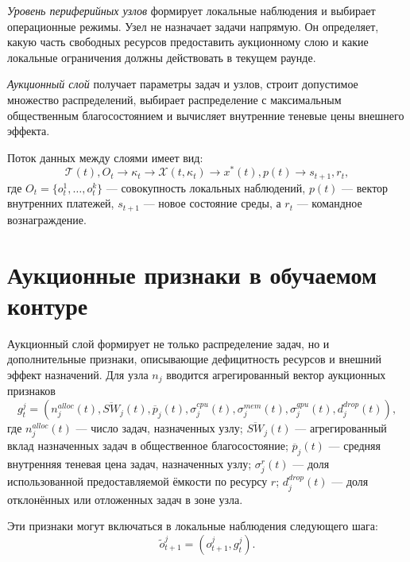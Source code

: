 \textit{Уровень периферийных узлов} формирует локальные наблюдения и выбирает операционные режимы. Узел не назначает задачи напрямую. Он определяет, какую часть свободных ресурсов предоставить аукционному слою и какие локальные ограничения должны действовать в текущем раунде.

\textit{Аукционный слой} получает параметры задач и узлов, строит допустимое множество распределений, выбирает распределение с максимальным общественным благосостоянием и вычисляет внутренние теневые цены внешнего эффекта.

Поток данных между слоями имеет вид:
\begin{equation}
    \mathcal{T}(t), O_t \rightarrow \kappa_t \rightarrow \mathcal{X}(t,\kappa_t) \rightarrow x^*(t),p(t) \rightarrow s_{t+1}, r_t,
    \label{eq:ch5_data_flow}
\end{equation}
где $O_t=\{o^1_t,\ldots,o^k_t\}$ --- совокупность локальных наблюдений, $p(t)$ --- вектор внутренних платежей, $s_{t+1}$ --- новое состояние среды, а $r_t$ --- командное вознаграждение.

\section{Аукционные признаки в обучаемом контуре}

Аукционный слой формирует не только распределение задач, но и дополнительные признаки, описывающие дефицитность ресурсов и внешний эффект назначений. Для узла $n_j$ вводится агрегированный вектор аукционных признаков
\begin{equation}
    g^j_t = \left(
    n^{alloc}_j(t),
    \overline{SW}_j(t),
    \overline{p}_j(t),
    \sigma^{cpu}_j(t),
    \sigma^{mem}_j(t),
    \sigma^{gpu}_j(t),
    d^{drop}_j(t)
    \right),
    \label{eq:ch5_auction_features}
\end{equation}
где $n^{alloc}_j(t)$ --- число задач, назначенных узлу; $\overline{SW}_j(t)$ --- агрегированный вклад назначенных задач в общественное благосостояние; $\overline{p}_j(t)$ --- средняя внутренняя теневая цена задач, назначенных узлу; $\sigma^{r}_j(t)$ --- доля использованной предоставляемой ёмкости по ресурсу $r$; $d^{drop}_j(t)$ --- доля отклонённых или отложенных задач в зоне узла.

Эти признаки могут включаться в локальные наблюдения следующего шага:
\begin{equation}
    \widetilde{o}^{j}_{t+1} = \left(o^{j}_{t+1}, g^{j}_t\right).
    \label{eq:ch5_enriched_observation}
\end{equation}

